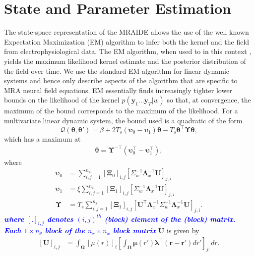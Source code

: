 \documentclass[journal,a4paper]{IEEEtran}
\newcommand{\parham}[1]{\textsf{\emph{\textbf{\textcolor{blue}{#1}}}}}
\begin{document}
\section{State and Parameter Estimation}
The state-space representation of the MRAIDE allows the use of the well known Expectation Maximization (EM) algorithm \cite{Dempster1977} to infer both the kernel and the field from electrophysiological data. The EM algorithm, when used to in this context \cite{Dewar2009}, yields the maximum likelihood kernel estimate and the posterior distribution of the field over time. We use the standard EM algorithm for linear dynamic systems \cite{Gibsona2005,Roweis1999,Shumway2000} and hence only describe aspects of the algorithm that are specific to MRA neural field equations. EM essentially finds increasingly tighter lower bounds on the likelihood of the kernel $p(\mathbf{y}_1 \ldots \mathbf{y}_T|w)$ so that, at convergence, the maximum of the bound corresponds to the maximum of the likelihood. For a multivariate linear dynamic system, the bound used is a quadratic of the form
\begin{equation}
 \mathcal Q\left(\boldsymbol \theta,\boldsymbol\theta'\right)=\beta+2T_s\left(\boldsymbol\upsilon_0-\boldsymbol\upsilon_1\right)\boldsymbol\theta-T_s\boldsymbol\theta^\top\boldsymbol\Upsilon\boldsymbol\theta,
\end{equation}
which has a maximum at
\begin{align}
 \boldsymbol \theta= \boldsymbol\Upsilon^{-\top}(\boldsymbol\upsilon_0^\top-\boldsymbol\upsilon_1^\top),
\end{align}
where
\begin{align}\label{eq:upsilon0}
 \boldsymbol\upsilon_0 & =\sum_{i,j=1}^{n_x}[\boldsymbol\Xi_0]_{i,j}[\Sigma_{w}^{-1}\boldsymbol\Lambda_{x}^{-1}\mathbf U]_{j,i}\\ 
 \boldsymbol\upsilon_1 & =\xi\sum_{i,j=1}^{n_x}[\boldsymbol\Xi_1]_{i,j}[\Sigma_{w}^{-1}\boldsymbol\Lambda_{x}^{-1}\mathbf U]_{j,i}\label{eq:upsilon1} \\
 \boldsymbol\Upsilon&=T_s\sum_{i,j=1}^{n_x}[\boldsymbol\Xi_1]_{i,j}[\mathbf{U}^{\mathsf T} \boldsymbol\Lambda_{x}^{-1}\Sigma_{w}^{-1}\boldsymbol\Lambda_{x}^{-1}\mathbf{U}]_{j,i}\label{eq:Upsilon}.
\end{align}
\parham{where $[.]_{i,j}$ denotes $\left(i,j\right)^{th}$ (block) element of the (block) matrix. Each $1\times n_{\theta}$ block of the $n_x \times n_x$ block matrix}
  $\mathbf U$ is given by
\begin{align}
\left[ \mathbf U\right] _{i,j}&=\int_{\boldsymbol \Omega}\left[\mu(r) \right]_i \left[\int_{\boldsymbol\Omega} \boldsymbol\mu\left(r'\right)\boldsymbol \lambda^\top \left(\mathbf{r-r'}\right) dr'\right]_{j:} dr.
\end{align}
\end{document}
